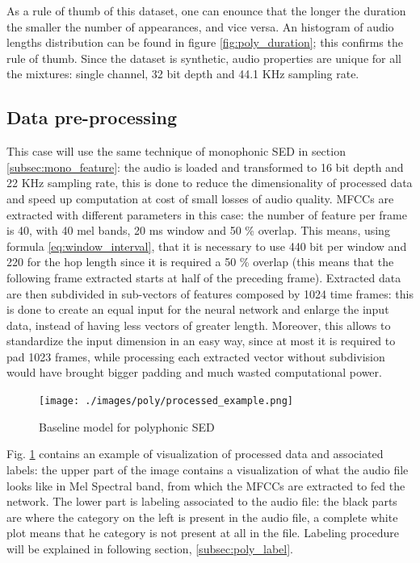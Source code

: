 \documentclass{article}
\begin{document}
As a rule of thumb of this dataset, one can enounce that the longer the duration the smaller the number of appearances, and vice versa. An histogram of audio lengths distribution can be found in figure \ref{fig:poly_duration}; this confirms the rule of thumb.\newline
Since the dataset is synthetic, audio properties are unique for all the mixtures: single channel, 32 bit depth and 44.1 KHz sampling rate.

\subsection{Data pre-processing}
\label{subsec:poly_feature}

This case will use the same technique of monophonic SED in section \ref{subsec:mono_feature}: the audio is loaded and transformed to 16 bit depth and 22 KHz sampling rate, this is done to reduce the dimensionality of processed data and speed up computation at cost of small losses of audio quality.\newline
MFCCs are extracted with different parameters in this case: the number of feature per frame is 40, with 40 mel bands, 20 ms window and 50 \% overlap. This means, using formula \ref{eq:window_interval}, that it is necessary to use 440 bit per window and 220 for the hop length since it is required a 50 \% overlap (this means that the following frame extracted starts at half of the preceding frame).\newline
Extracted data are then subdivided in sub-vectors of features composed by 1024 time frames: this is done to create an equal input for the neural network and enlarge the input data, instead of having less vectors of greater length. Moreover, this allows to standardize the input dimension in an easy way, since at most it is required to pad 1023 frames, while processing each extracted vector without subdivision would have brought bigger padding and much wasted computational power.

\begin{figure}[H]
	\centering
	\texttt{[image: ./images/poly/processed\_example.png]}	
	\caption{Baseline model for polyphonic SED}
	\label{fig:poly_processed}
\end{figure}

Fig. \ref{fig:poly_processed} contains an example of visualization of processed data and associated labels: the upper part of the image contains a visualization of what the audio file looks like in Mel Spectral band, from which the MFCCs are extracted to fed the network. The lower part is labeling associated to the audio file: the black parts are where the category on the left is present in the audio file, a complete white plot means that he category is not present at all in the file. Labeling procedure will be explained in following section, \ref{subsec:poly_label}.
\end{document}
